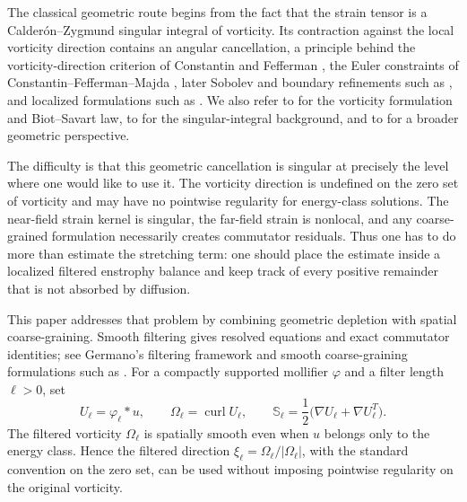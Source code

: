 \documentclass[11pt]{article}
\numberwithin{equation}{section}
\theoremstyle{plain}
\theoremstyle{definition}
\theoremstyle{remark}
\DeclareMathOperator{\curl}{curl}
\begin{document}
The classical geometric route begins from the fact that the strain tensor is a Calder\'on--Zygmund singular integral of vorticity.  Its contraction against the local vorticity direction contains an angular cancellation, a principle behind the vorticity-direction criterion of Constantin and Fefferman \cite{ConstantinFefferman1993}, the Euler constraints of Constantin--Fefferman--Majda \cite{ConstantinFeffermanMajda1996}, later Sobolev and boundary refinements such as \cite{BeiraoBerselli2002}, and localized formulations such as \cite{Grujic2009}.  We also refer to \cite{MajdaBertozzi2002} for the vorticity formulation and Biot--Savart law, to \cite{CalderonZygmund1952} for the singular-integral background, and to \cite{Constantin1994} for a broader geometric perspective.

The difficulty is that this geometric cancellation is singular at precisely the level where one would like to use it.  The vorticity direction is undefined on the zero set of vorticity and may have no pointwise regularity for energy-class solutions.  The near-field strain kernel is singular, the far-field strain is nonlocal, and any coarse-grained formulation necessarily creates commutator residuals.  Thus one has to do more than estimate the stretching term: one should place the estimate inside a localized filtered enstrophy balance and keep track of every positive remainder that is not absorbed by diffusion.

This paper addresses that problem by combining geometric depletion with spatial coarse-graining.  Smooth filtering gives resolved equations and exact commutator identities; see Germano's filtering framework \cite{Germano1992} and smooth coarse-graining formulations such as \cite{EyinkAluie2009}.  For a compactly supported mollifier $\varphi$ and a filter length $\ell>0$, set
\[
U_\ell=\varphi_\ell*u,
\qquad
\Omega_\ell=\curl U_\ell,
\qquad
\mathbb S_\ell=\frac12\bigl(\nabla U_\ell+\nabla U_\ell^{T}\bigr).
\]
The filtered vorticity $\Omega_\ell$ is spatially smooth even when $u$ belongs only to the energy class.  Hence the filtered direction $\xi_\ell=\Omega_\ell/|\Omega_\ell|$, with the standard convention on the zero set, can be used without imposing pointwise regularity on the original vorticity.
\end{document}
